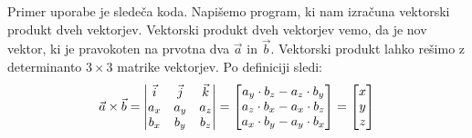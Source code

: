 \documentclass[a4paper, 12pt]{article}
\begin{document}
Primer uporabe  je sledeča koda. Napišemo program, ki nam izračuna vektorski produkt dveh vektorjev. Vektorski produkt dveh vektorjev vemo, da je nov vektor, ki je pravokoten na prvotna dva $\vec{a}$ in $\vec{b}$. Vektorski produkt lahko rešimo z determinanto $3 \times 3$ matrike vektorjev. Po definiciji sledi:
\begin{equation*}
\vec{a} \times \vec{b} = 
\begin{vmatrix}
\vec{i} & \vec{j} & \vec{k} \\
a_x & a_y & a_z\\ 
b_x & b_y &b_z \notag
\end{vmatrix} = 
\begin{bmatrix}
a_y\cdot b_z - a_z\cdot b_y \\
a_z\cdot b_x - a_x\cdot b_z \\
a_x\cdot b_y - a_y\cdot b_x
\end{bmatrix} = 
\begin{bmatrix}
x \\ 
y \\ 
z
\end{bmatrix}
\end{equation*}
\end{document}
